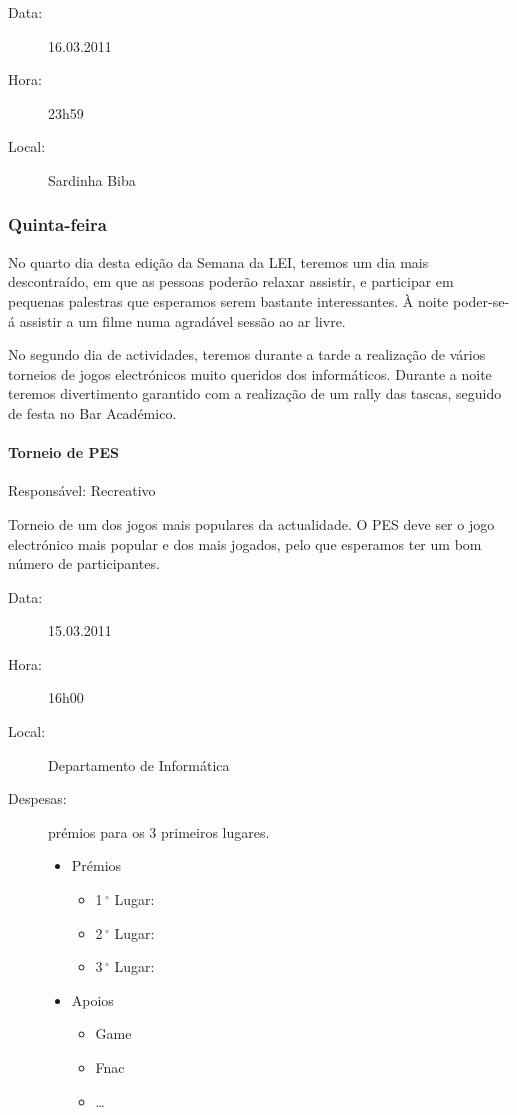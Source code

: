 \begin{description}
	\item[Data:] 16.03.2011
	\item[Hora:] 23h59
	\item[Local:] Sardinha Biba
\end{description}


\subsubsection*{Quinta-feira}
No quarto dia desta edição da Semana da LEI, teremos um dia mais descontraído, em que as pessoas poderão relaxar assistir, e participar em pequenas palestras que esperamos serem bastante interessantes. À noite poder-se-á assistir a um filme numa agradável sessão ao ar livre.



No segundo dia de actividades, teremos durante a tarde a realização de vários torneios de jogos electrónicos muito queridos dos informáticos. Durante a noite teremos divertimento garantido com a realização de um rally das tascas, seguido de festa no Bar Académico.


\paragraph{Torneio de PES}
Responsável: Recreativo

Torneio de um dos jogos mais populares da actualidade. O PES deve ser o jogo electrónico mais popular e dos mais jogados, pelo que esperamos ter um bom número de participantes.

\begin{description}
	\item[Data:] 15.03.2011
	\item[Hora:] 16h00
	\item[Local:] Departamento de Informática
	\item[Despesas:] prémios para os 3 primeiros lugares.
	\begin{itemize}
		\item Prémios
		\begin{itemize}
			\item 1$\,^{\circ}$ Lugar:
			\item 2$\,^{\circ}$ Lugar:
			\item 3$\,^{\circ}$ Lugar:
		\end{itemize}
		\item Apoios
		\begin{itemize}
			\item Game
			\item Fnac
			\item \dots  
		\end{itemize}
	\end{itemize}
\end{description}


